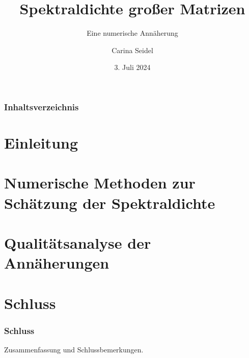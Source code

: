 \documentclass{beamer}
\title{Spektraldichte großer Matrizen}
\subtitle{Eine numerische Annäherung}
\author{Carina Seidel}
\institute[Universität Potsdam]{Universität Potsdam}
\date[3. Juli 2024]{3. Juli 2024}
\newcommand{\1}{\mathds{1}}
\begin{document}
\begin{frame}
\titlepage
\end{frame}
\begin{frame}
\frametitle{Inhaltsverzeichnis}
\tableofcontents
\end{frame}

\section{Einleitung}



\section{Numerische Methoden zur Schätzung der Spektraldichte}



\section{Qualitätsanalyse der Annäherungen}



\section{Schluss}

\begin{frame}
\frametitle{Schluss}
Zusammenfassung und Schlussbemerkungen.
\end{frame}
\end{document}
